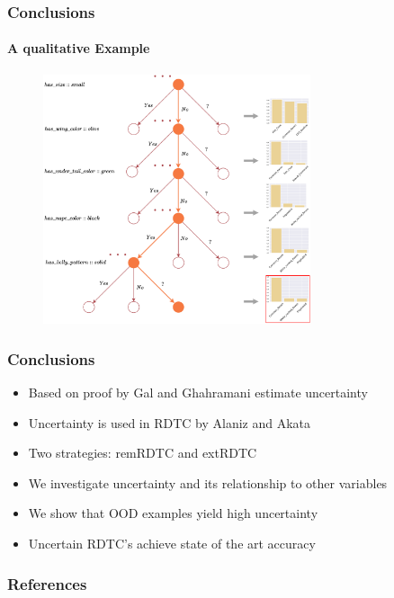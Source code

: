 \documentclass[9pt]{beamer}
\begin{document}
\begin{frame}
\frametitle{Conclusions}
\framesubtitle{A qualitative Example}
\begin{figure}
	\centering
	\includegraphics[width=0.7\textwidth]{images/example_tree.pdf}
\label{fig:example_tree}
\end{figure}
\end{frame} 







\begin{frame}
\frametitle{Conclusions}
\begin{itemize}
	\item Based on proof by Gal and Ghahramani \cite{gal2016dropout} estimate uncertainty
	\item Uncertainty is used in RDTC by Alaniz and Akata \cite{alaniz2019explainable}
	\item Two strategies: remRDTC and extRDTC
	\item We investigate uncertainty and its relationship to other variables
	\item We show that OOD examples yield high uncertainty
	\item Uncertain RDTC's achieve state of the art accuracy
\end{itemize}
\end{frame}




\begin{frame}
\frametitle{References}
	
	
\end{frame}
\end{document}

